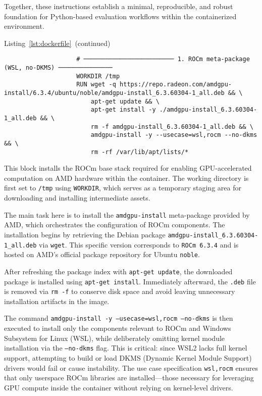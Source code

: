 Together, these instructions establish a minimal, reproducible, and robust foundation for Python-based evaluation workflows within the containerized environment.

\vspace{1em}

\begin{minipage}{\textwidth}
	\captionsetup{type=listing}
	\caption*{Listing~\ref{lst:dockerfile}~(continued)}

	\begin{verbatim}
                    # ───────────────────────── 1. ROCm meta-package (WSL, no-DKMS) ───────────────
                    WORKDIR /tmp
                    RUN wget -q https://repo.radeon.com/amdgpu-install/6.3.4/ubuntu/noble/amdgpu-install_6.3.60304-1_all.deb && \
                        apt-get update && \
                        apt-get install -y ./amdgpu-install_6.3.60304-1_all.deb && \
                        rm -f amdgpu-install_6.3.60304-1_all.deb && \
                        amdgpu-install -y --usecase=wsl,rocm --no-dkms && \
                        rm -rf /var/lib/apt/lists/*

    \end{verbatim}
\end{minipage}

This block installs the ROCm base stack required for enabling GPU-accelerated computation on AMD hardware within the container. The working directory is first set to \texttt{/tmp} using \texttt{WORKDIR}, which serves as a temporary staging area for downloading and installing intermediate assets.

The main task here is to install the \texttt{amdgpu-install} meta-package provided by AMD, which orchestrates the configuration of ROCm components. The installation begins by retrieving the Debian package \texttt{amdgpu-install\_6.3.60304-1\_all.deb} via \texttt{wget}. This specific version corresponds to \texttt{ROCm 6.3.4} and is hosted on AMD’s official package repository for Ubuntu \texttt{noble}.

After refreshing the package index with \texttt{apt-get update}, the downloaded package is installed using \texttt{apt-get install}. Immediately afterward, the \texttt{.deb} file is removed via \texttt{rm -f} to conserve disk space and avoid leaving unnecessary installation artifacts in the image.

The command \texttt{amdgpu-install -y --usecase=wsl,rocm --no-dkms} is then executed to install only the components relevant to ROCm and Windows Subsystem for Linux (WSL), while deliberately omitting kernel module installation via the \texttt{--no-dkms} flag. This is critical: since WSL2 lacks full kernel support, attempting to build or load DKMS (Dynamic Kernel Module Support) drivers would fail or cause instability. The use case specification \texttt{wsl,rocm} ensures that only userspace ROCm libraries are installed---those necessary for leveraging GPU compute inside the container without relying on kernel-level drivers.

